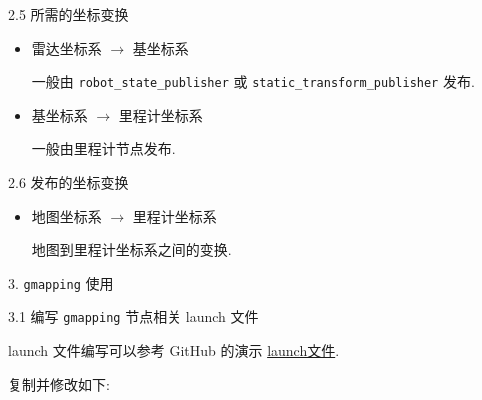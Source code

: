 \documentclass[openany, fontset=windowsold]{ctexbook}
\theoremstyle{kaiti}
\theoremstyle{normal}
\begin{document}
2.5 所需的坐标变换

\begin{itemize}
  \item 雷达坐标系 $\rightarrow$ 基坐标系

  一般由 \verb|robot_state_publisher| 或 \verb|static_transform_publisher| 发布.
  
  \item 基坐标系 $\rightarrow$ 里程计坐标系
  
  一般由里程计节点发布.
\end{itemize}

2.6 发布的坐标变换

\begin{itemize}
  \item 地图坐标系 $\rightarrow$ 里程计坐标系

  地图到里程计坐标系之间的变换.
\end{itemize}

3. \verb|gmapping| 使用

3.1 编写 \verb|gmapping| 节点相关 launch 文件

launch 文件编写可以参考 GitHub 的演示 \href{https://github.com/ros-perception/slam_gmapping/blob/melodic-devel/gmapping/launch/slam_gmapping_pr2.launch}{launch文件}.

复制并修改如下:
\end{document}
